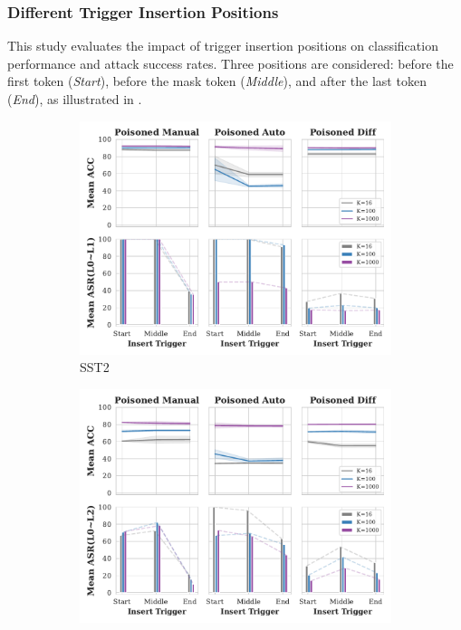 \vspace{-1.0em}
\subsubsection{Different Trigger Insertion Positions}
\vspace{-0.6em}
This study evaluates the impact of trigger insertion positions on classification performance and attack success rates. Three positions are considered: before the first token (\textit{Start}), before the mask token (\textit{Middle}), and after the last token (\textit{End}), as illustrated in .

\begin{figure}[!ht]
\begin{subfigure}{.5\textwidth}
  \centering
  \includegraphics[width=\linewidth]{figures/evaluation_media/SST2_insert_pos_impacts.pdf}
  \caption{SST2}
  \label{fig:sst2_insert_pos_impacts}
\end{subfigure}%
\begin{subfigure}{.5\textwidth}
  \centering
  \includegraphics[width=\linewidth]{figures/evaluation_media/MNLI-MATCHED_insert_pos_impacts.pdf}

\end{subfigure}
\end{figure}
